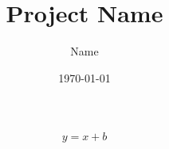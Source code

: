 \documentclass[12pt]{article}
\begin{document}
\title{Project Name}
\author{Name}
\date{\today}

\maketitle

\tableofcontents
\newpage




\begin{eqnarray}
	y = x + b
\end{eqnarray}



\end{document}
